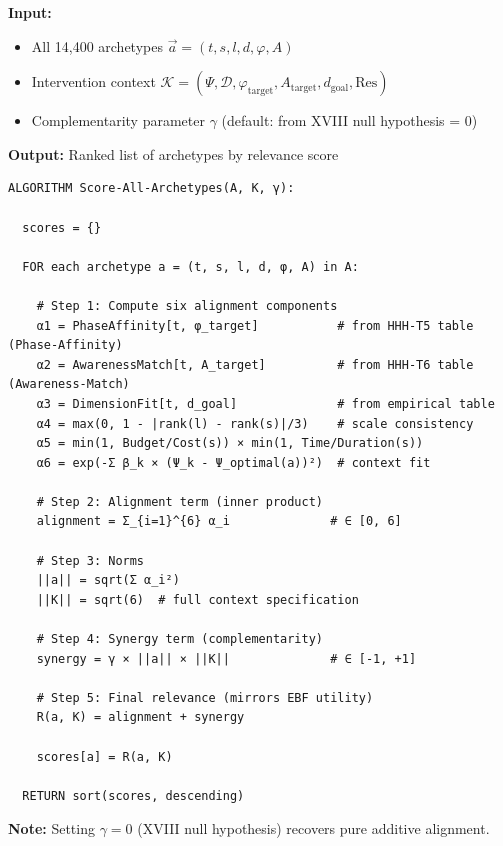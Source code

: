 \begin{tcolorbox}[colback=orange!5!white, colframe=orange!75!black,
    title=\textbf{Algorithm HHH-A2: Relevance Score via Inner Product}]

\textbf{Input:}
\begin{itemize}[nosep]
    \item All 14,400 archetypes $\vec{a} = (t, s, l, d, \varphi, A)$
    \item Intervention context $\mathcal{K} = (\Psi, \mathcal{D}, \varphi_{\text{target}}, A_{\text{target}}, d_{\text{goal}}, \text{Res})$
    \item Complementarity parameter $\gamma$ (default: from XVIII null hypothesis = 0)
\end{itemize}

\textbf{Output:} Ranked list of archetypes by relevance score

\begin{verbatim}
ALGORITHM Score-All-Archetypes(A, K, γ):

  scores = {}

  FOR each archetype a = (t, s, l, d, φ, A) in A:

    # Step 1: Compute six alignment components
    α1 = PhaseAffinity[t, φ_target]           # from HHH-T5 table (Phase-Affinity)
    α2 = AwarenessMatch[t, A_target]          # from HHH-T6 table (Awareness-Match)
    α3 = DimensionFit[t, d_goal]              # from empirical table
    α4 = max(0, 1 - |rank(l) - rank(s)|/3)    # scale consistency
    α5 = min(1, Budget/Cost(s)) × min(1, Time/Duration(s))
    α6 = exp(-Σ β_k × (Ψ_k - Ψ_optimal(a))²)  # context fit

    # Step 2: Alignment term (inner product)
    alignment = Σ_{i=1}^{6} α_i              # ∈ [0, 6]

    # Step 3: Norms
    ||a|| = sqrt(Σ α_i²)
    ||K|| = sqrt(6)  # full context specification

    # Step 4: Synergy term (complementarity)
    synergy = γ × ||a|| × ||K||              # ∈ [-1, +1]

    # Step 5: Final relevance (mirrors EBF utility)
    R(a, K) = alignment + synergy

    scores[a] = R(a, K)

  RETURN sort(scores, descending)
\end{verbatim}

\textbf{Note:} Setting $\gamma = 0$ (XVIII null hypothesis) recovers pure additive alignment.

\end{tcolorbox}


